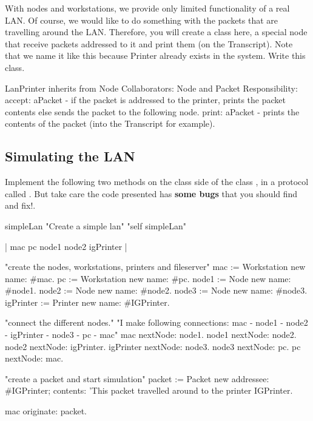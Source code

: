 \exercise With nodes and workstations, we provide only limited
functionality of a real LAN. Of course, we would like to do
something with the packets that are travelling around the LAN.
Therefore, you will create a class  here, a
special node that receive packets addressed to it and print them
(on the Transcript). Note that we name it like this because
Printer already exists in the system. Write this class.

\begin{code}
LanPrinter inherits from Node
Collaborators: Node and Packet
Responsibility:
accept: aPacket - if the packet is addressed to the 
printer, prints the packet contents else sends the packet 
to the following node.
print: aPacket - prints the contents of the packet 
(into the Transcript for example).
\end{code}


\subsection*{Simulating the LAN}

Implement the following two methods on the class side of the class
, in a protocol called . But take
care the code presented has \textbf{some bugs} that you should
find and fix!.

\begin{code}
simpleLan
  "Create a simple lan"
  "self simpleLan"

 | mac pc node1 node2 igPrinter |

"create the nodes, workstations, printers and fileserver"
mac := Workstation new name: \#mac.
pc := Workstation new name: \#pc.
node1 := Node new name: \#node1.
node2 := Node new name: \#node2.
node3 := Node new name: \#node3.
igPrinter := Printer new name: \#IGPrinter.

"connect the different nodes."
"I make following connections:
\tab \tab mac -\ct{>} node1 -\ct{>} node2 -\ct{>}
\tab \tab igPrinter -\ct{>} node3 -\ct{>} pc -\ct{>} mac"
mac nextNode: node1.
node1 nextNode: node2.
node2 nextNode: igPrinter.
igPrinter nextNode: node3.
node3 nextNode: pc.
pc nextNode: mac.

"create a packet and start simulation"
packet := Packet new
            addressee: \#IGPrinter;
            contents: 'This packet travelled around 
to the printer IGPrinter.

mac originate: packet.
\end{code}

